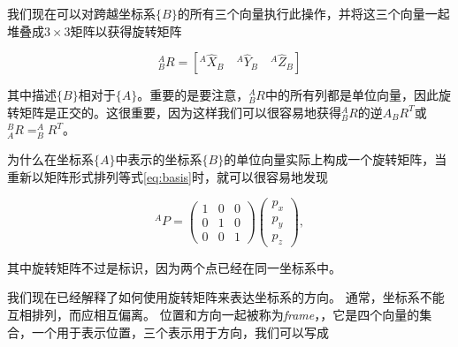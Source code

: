 我们现在可以对跨越坐标系$\{B\}$的所有三个向量执行此操作，并将这三个向量一起堆叠成$3\times3$矩阵以获得旋转矩阵

%
\begin{equation}
^A_BR=[^A\hat{X}_B \quad ^A\hat{Y}_B \quad ^A\hat{Z}_B]
\end{equation}
%

其中描述$\{B\}$相对于$\{A\}$。重要的是要注意，$^A_BR$中的所有列都是单位向量，因此旋转矩阵是正交的。这很重要，因为这样我们可以很容易地获得$^A_BR$的逆$A_BR^T$或$^B_AR=^A_BR^T$。


为什么在坐标系$\{A\}$中表示的坐标系$\{B\}$的单位向量实际上构成一个旋转矩阵，当重新以矩阵形式排列等式\ref{eq:basis}时，就可以很容易地发现

\begin{equation}
^AP=\left(\begin{array}{ccc}1 & 0 & 0\\0 & 1 & 0\\0 & 0 & 1\end{array}\right)\left(\begin{array}{c}p_x\\p_y\\p_z\end{array}\right),
\end{equation}


其中旋转矩阵不过是标识，因为两个点已经在同一坐标系中。

%

我们现在已经解释了如何使用旋转矩阵来表达坐标系的方向。 通常，坐标系不能互相排列，而应相互偏离。 位置和方向一起被称为\emph{frame}，，它是四个向量的集合，一个用于表示位置，三个表示用于方向，我们可以写成

